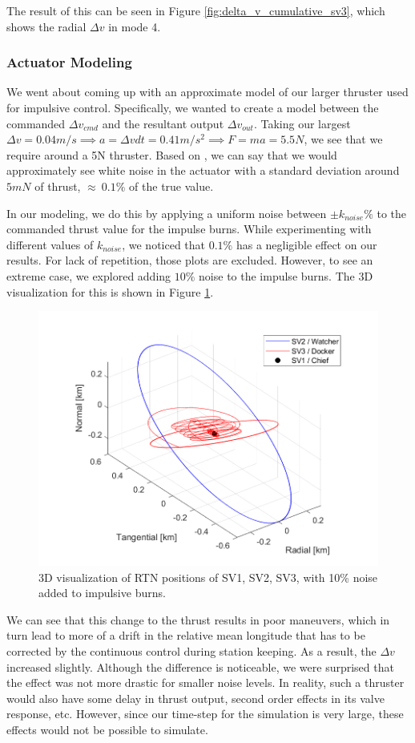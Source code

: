The result of this can be seen in Figure \ref{fig:delta_v_cumulative_sv3}, which shows the radial $\Delta v$ in mode 4.

\subsubsection{Actuator Modeling}
We went about coming up with an approximate model of our larger thruster used for impulsive control. Specifically, we wanted to create a model between the commanded $\Delta v_{cmd}$ and the resultant output $\Delta v_{out}$. Taking our largest $\Delta v = 0.04 m/s \implies a = \Delta v dt = 0.41 m/s^2 \implies F = ma = 5.5 N$, we see that we require around a 5N thruster. Based on \cite{polk2013recommended}, we can say that we would approximately see white noise in the actuator with a standard deviation around $5 mN$ of thrust, $\approx~0.1\%$ of the true value.

In our modeling, we do this by applying a uniform noise between $\pm k_{noise} \%$ to the commanded thrust value for the impulse burns. While experimenting with different values of $k_{noise}$, we noticed that $0.1\%$ has a negligible effect on our results. For lack of repetition, those plots are excluded. However, to see an extreme case, we explored adding $10\%$ noise to the impulse burns. The 3D visualization for this is shown in Figure \ref{fig:3d_vis_with_act_noise}.

\begin{figure}[H]
    \centering
    \includegraphics[width=0.5\linewidth]{sim/figures/PS9/ROE_3d_all_maneuvers_act_noise.png}
    \caption{3D visualization of RTN positions of SV1, SV2, SV3, with 10\% noise added to impulsive burns.}
    \label{fig:3d_vis_with_act_noise}
\end{figure}

We can see that this change to the thrust results in poor maneuvers, which in turn lead to more of a drift in the relative mean longitude that has to be corrected by the continuous control during station keeping. As a result, the $\Delta v$ increased slightly. Although the difference is noticeable, we were surprised that the effect was not more drastic for smaller noise levels.
In reality, such a thruster would also have some delay in thrust output, second order effects in its valve response, etc. However, since our time-step for the simulation is very large, these effects would not be possible to simulate.

